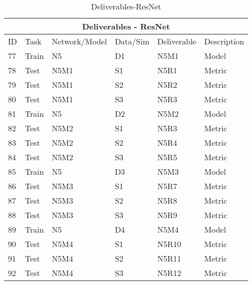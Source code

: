 \documentclass{article}
\begin{document}
\begin{table}[]
\begin{center}
\begin{tabular}{|l|l|l|l|l|l|}
\hline
\multicolumn{6}{|c|}{Deliverables - ResNet} \\ \hline

ID & Task &  Network/Model & Data/Sim & Deliverable & Description \\ \hline\hline
77 & Train & N5 & D1 & N5M1 & Model \\ \hline
78 & Test & N5M1 & S1 & N5R1 & Metric \\ \hline
79 & Test & N5M1 & S2 & N5R2 & Metric \\ \hline
80 & Test & N5M1 & S3 & N5R3 & Metric \\ \hline\hline

81 & Train & N5 & D2 & N5M2 & Model \\ \hline
82 & Test & N5M2 & S1 & N5R3 & Metric \\ \hline
83 & Test & N5M2 & S2 & N5R4 & Metric \\ \hline
84 & Test & N5M2 & S3 & N5R5 & Metric \\ \hline\hline

85 & Train & N5 & D3 & N5M3 & Model \\ \hline
86 & Test & N5M3 & S1 & N5R7 & Metric \\ \hline
87 & Test & N5M3 & S2 & N5R8 & Metric \\ \hline
88 & Test & N5M3 & S3 & N5R9 & Metric \\ \hline\hline

89 & Train & N5 & D4 & N5M4 & Model \\ \hline
90 & Test & N5M4 & S1 & N5R10 & Metric \\ \hline
91 & Test & N5M4 & S2 & N5R11 & Metric \\ \hline
92 & Test & N5M4 & S3 & N5R12 & Metric \\ \hline 

\end{tabular}
\end{center}
\caption{Deliverables-ResNet}
\label{Deliverables-ResNet}
\end{table}
\end{document}
